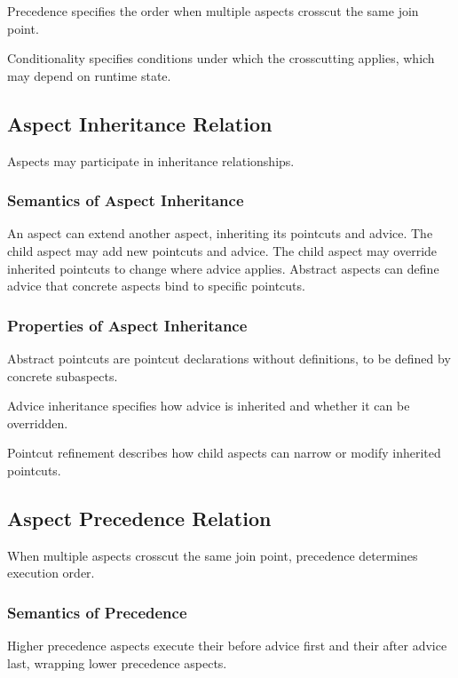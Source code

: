 \documentclass[11pt]{article}
\begin{document}
Precedence specifies the order when multiple aspects crosscut the same join point.

Conditionality specifies conditions under which the crosscutting applies, which may depend on runtime state.

\subsection{Aspect Inheritance Relation}

Aspects may participate in inheritance relationships.

\subsubsection{Semantics of Aspect Inheritance}

An aspect can extend another aspect, inheriting its pointcuts and advice. The child aspect may add new pointcuts and advice. The child aspect may override inherited pointcuts to change where advice applies. Abstract aspects can define advice that concrete aspects bind to specific pointcuts.

\subsubsection{Properties of Aspect Inheritance}

Abstract pointcuts are pointcut declarations without definitions, to be defined by concrete subaspects.

Advice inheritance specifies how advice is inherited and whether it can be overridden.

Pointcut refinement describes how child aspects can narrow or modify inherited pointcuts.

\subsection{Aspect Precedence Relation}

When multiple aspects crosscut the same join point, precedence determines execution order.

\subsubsection{Semantics of Precedence}

Higher precedence aspects execute their before advice first and their after advice last, wrapping lower precedence aspects.
\end{document}
